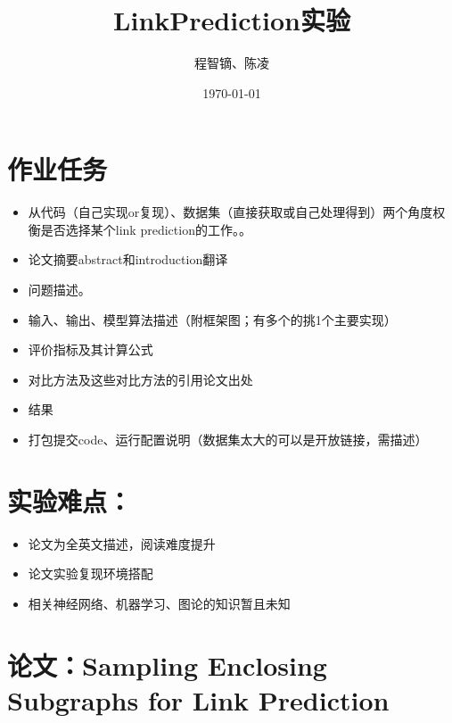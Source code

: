 \documentclass{article}
\title{LinkPrediction实验}
\author{程智镝、陈凌}
\date{\today}
\begin{document}
\maketitle

\section*{作业任务}
\begin{itemize}
    \item 从代码（自己实现or复现）、数据集（直接获取或自己处理得到）两个角度权衡是否选择某个link prediction的工作。。
    \item 论文摘要abstract和introduction翻译
    \item 问题描述。
    \item 输入、输出、模型算法描述（附框架图；有多个的挑1个主要实现）
    \item 评价指标及其计算公式
    \item 对比方法及这些对比方法的引用论文出处
    \item 结果
    \item 打包提交code、运行配置说明（数据集太大的可以是开放链接，需描述）
\end{itemize}
\section*{实验难点：}
\begin{itemize}
    \item 论文为全英文描述，阅读难度提升
    \item 论文实验复现环境搭配
    \item 相关神经网络、机器学习、图论的知识暂且未知
\end{itemize}
\section*{论文：Sampling Enclosing Subgraphs for Link Prediction}
\end{document}

